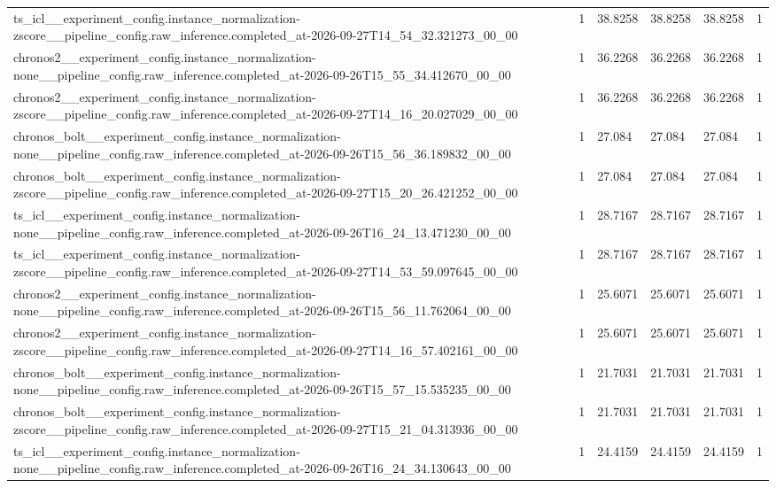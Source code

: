 \begin{tabular}{llllll}
ts\_icl\_\_experiment\_config.instance\_normalization-zscore\_\_pipeline\_config.raw\_inference.completed\_at-2026-09-27T14\_54\_32.321273\_00\_00 & 1 & 38.8258 & 38.8258 & 38.8258 & 1 \\
chronos2\_\_experiment\_config.instance\_normalization-none\_\_pipeline\_config.raw\_inference.completed\_at-2026-09-26T15\_55\_34.412670\_00\_00 & 1 & 36.2268 & 36.2268 & 36.2268 & 1 \\
chronos2\_\_experiment\_config.instance\_normalization-zscore\_\_pipeline\_config.raw\_inference.completed\_at-2026-09-27T14\_16\_20.027029\_00\_00 & 1 & 36.2268 & 36.2268 & 36.2268 & 1 \\
chronos\_bolt\_\_experiment\_config.instance\_normalization-none\_\_pipeline\_config.raw\_inference.completed\_at-2026-09-26T15\_56\_36.189832\_00\_00 & 1 & 27.084 & 27.084 & 27.084 & 1 \\
chronos\_bolt\_\_experiment\_config.instance\_normalization-zscore\_\_pipeline\_config.raw\_inference.completed\_at-2026-09-27T15\_20\_26.421252\_00\_00 & 1 & 27.084 & 27.084 & 27.084 & 1 \\
ts\_icl\_\_experiment\_config.instance\_normalization-none\_\_pipeline\_config.raw\_inference.completed\_at-2026-09-26T16\_24\_13.471230\_00\_00 & 1 & 28.7167 & 28.7167 & 28.7167 & 1 \\
ts\_icl\_\_experiment\_config.instance\_normalization-zscore\_\_pipeline\_config.raw\_inference.completed\_at-2026-09-27T14\_53\_59.097645\_00\_00 & 1 & 28.7167 & 28.7167 & 28.7167 & 1 \\
chronos2\_\_experiment\_config.instance\_normalization-none\_\_pipeline\_config.raw\_inference.completed\_at-2026-09-26T15\_56\_11.762064\_00\_00 & 1 & 25.6071 & 25.6071 & 25.6071 & 1 \\
chronos2\_\_experiment\_config.instance\_normalization-zscore\_\_pipeline\_config.raw\_inference.completed\_at-2026-09-27T14\_16\_57.402161\_00\_00 & 1 & 25.6071 & 25.6071 & 25.6071 & 1 \\
chronos\_bolt\_\_experiment\_config.instance\_normalization-none\_\_pipeline\_config.raw\_inference.completed\_at-2026-09-26T15\_57\_15.535235\_00\_00 & 1 & 21.7031 & 21.7031 & 21.7031 & 1 \\
chronos\_bolt\_\_experiment\_config.instance\_normalization-zscore\_\_pipeline\_config.raw\_inference.completed\_at-2026-09-27T15\_21\_04.313936\_00\_00 & 1 & 21.7031 & 21.7031 & 21.7031 & 1 \\
ts\_icl\_\_experiment\_config.instance\_normalization-none\_\_pipeline\_config.raw\_inference.completed\_at-2026-09-26T16\_24\_34.130643\_00\_00 & 1 & 24.4159 & 24.4159 & 24.4159 & 1 \\

\end{tabular}
